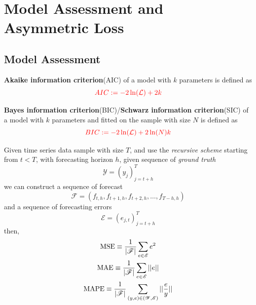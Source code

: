 \documentclass[11pt]{article}
\begin{document}
	\section{Model Assessment and Asymmetric Loss}
		\subsection{Model Assessment}
			\begin{definition}
				\textbf{Akaike information criterion}(AIC) of a model with $k$ parameters is defined as
				\begin{equation}
					\textcolor{red}{AIC := -2 \ln(\mathcal{{L}}) + 2k}
				\end{equation}
			\end{definition}
			
			\begin{definition}
				\textbf{Bayes information criterion}(BIC)/\textbf{Schwarz information criterion}(SIC) of a model with $k$ parameters and fitted on the sample with size $N$ is defined as
				\begin{equation}
					\textcolor{red}{BIC := -2 \ln(\mathcal{{L}}) + 2 \ln(N) k}
				\end{equation}
			\end{definition}
			
			\begin{definition}
				Given time series data sample with size $T$, and use the \emph{recursive scheme} starting from $t < T$, with forecasting horizon $h$, given sequence of \emph{ground truth}
				\begin{equation}
					\mathscr{Y} = (y_j)_{j=t+h}^T
				\end{equation}
				we can construct a sequence of forecast
				\begin{equation}
					\mathscr{F} = (f_{t, h}, f_{t+1, h}, f_{t+2, h}, \dots, f_{T-h, h})
				\end{equation}
				and a sequence of forecasting errors
				\begin{equation}
					\mathscr{E} = (e_{j, t})_{j=t+h}^T
				\end{equation}
				then,
				\begin{gather}
					\text{{MSE}} \equiv \frac{1}{|\mathscr{F}|} \sum_{e \in \mathscr{E}} e^2 \\
					\text{{MAE}} \equiv \frac{1}{|\mathscr{F}|} \sum_{e \in \mathscr{E}} \vert \vert {e} \vert \vert \\
					\text{{MAPE}} \equiv \frac{1}{|\mathscr{F}|} \sum_{(y,e) \in (\mathscr{Y}, \mathscr{E})} \vert \vert {\frac{e}{y}} \vert \vert
				\end{gather}
			\end{definition}
\end{document}
